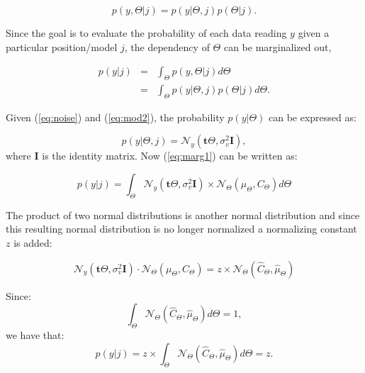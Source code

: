 \begin{equation}\label{eq:bayes1}
p(y,\Theta | j) = p(y|\Theta,j)p(\Theta | j).
\end{equation}

Since the goal is to evaluate the probability of each data reading $y$ given a particular position/model $j$, the dependency of $\Theta$ can be marginalized out,

\begin{eqnarray}\nonumber
p(y|j) &=& \int_\Theta p(y,\Theta|j) d\Theta \\
\label{eq:marg1} &=& \int_\Theta p(y|\Theta,j)p(\Theta|j) d\Theta.
\end{eqnarray}

Given (\ref{eq:noise}) and (\ref{eq:mod2}), the probability $p(y|\Theta)$ can be expressed as:

\begin{equation}\label{eq:probybeta}
p(y|\Theta,j) = \mathcal{N}_y(\textbf{t}\Theta,\sigma_v^2\textbf{I}),
\end{equation}
where $\textbf{I}$ is the identity matrix.
Now (\ref{eq:marg1}) can be written as:

\begin{equation}\label{eq:marg2}
p(y|j) = \int_\Theta \mathcal{N}_y(\textbf{t}\Theta,\sigma_v^2 \textbf{I})\times\mathcal{N}_\Theta(\mu_\Theta,C_\Theta) d\Theta
\end{equation}

The product of two normal distributions is another normal distribution and since this resulting normal distribution is no longer normalized a normalizing constant $z$ is added:

\begin{equation}\label{eq:prod1}
\mathcal{N}_y(\textbf{t}\Theta,\sigma_v^2 \textbf{I})\cdot\mathcal{N}_\Theta(\mu_\Theta,C_\Theta) = z \times \mathcal{N}_\Theta(\hat{C}_\Theta,\hat{\mu}_\Theta)
\end{equation}

Since:
\begin{equation}\label{eq:marg3}
\int_\Theta \mathcal{N}_\Theta(\hat{C}_\Theta,\hat{\mu}_\Theta) d\Theta = 1,
\end{equation}
we have that:
\begin{equation}\label{eq:marg4}
p(y|j) = z \times \int_\Theta \mathcal{N}_\Theta(\hat{C}_\Theta,\hat{\mu}_\Theta) d\Theta = z.
\end{equation}

